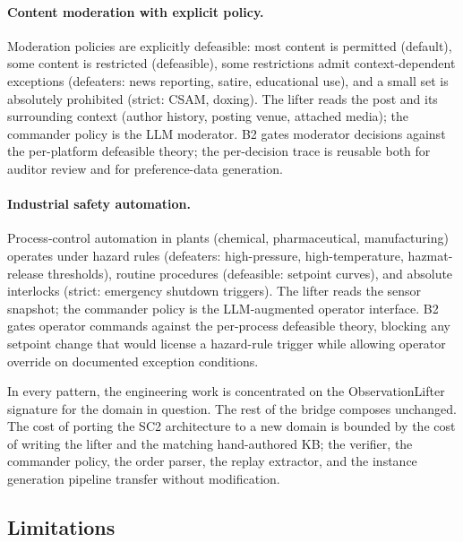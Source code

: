 \documentclass{article}
\theoremstyle{definition}
\begin{document}
\paragraph{Content moderation with explicit policy.} Moderation policies are explicitly defeasible: most content is permitted (default), some content is restricted (defeasible), some restrictions admit context-dependent exceptions (defeaters: news reporting, satire, educational use), and a small set is absolutely prohibited (strict: CSAM, doxing). The lifter reads the post and its surrounding context (author history, posting venue, attached media); the commander policy is the LLM moderator. B2 gates moderator decisions against the per-platform defeasible theory; the per-decision trace is reusable both for auditor review and for preference-data generation.

\paragraph{Industrial safety automation.} Process-control automation in plants (chemical, pharmaceutical, manufacturing) operates under hazard rules (defeaters: high-pressure, high-temperature, hazmat-release thresholds), routine procedures (defeasible: setpoint curves), and absolute interlocks (strict: emergency shutdown triggers). The lifter reads the sensor snapshot; the commander policy is the LLM-augmented operator interface. B2 gates operator commands against the per-process defeasible theory, blocking any setpoint change that would license a hazard-rule trigger while allowing operator override on documented exception conditions.

In every pattern, the engineering work is concentrated on the ObservationLifter signature for the domain in question. The rest of the bridge composes unchanged. The cost of porting the SC2 architecture to a new domain is bounded by the cost of writing the lifter and the matching hand-authored KB; the verifier, the commander policy, the order parser, the replay extractor, and the instance generation pipeline transfer without modification.


\subsection{Limitations}\label{subsec:sc2live-limits}
\end{document}
